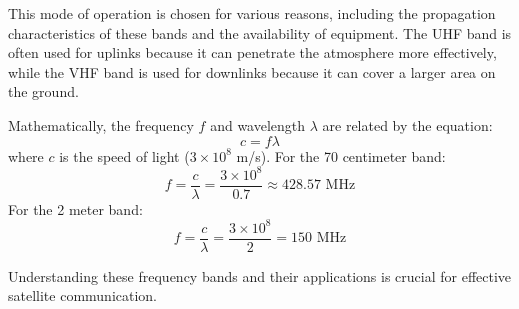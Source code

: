 This mode of operation is chosen for various reasons, including the propagation characteristics of these bands and the availability of equipment. The UHF band is often used for uplinks because it can penetrate the atmosphere more effectively, while the VHF band is used for downlinks because it can cover a larger area on the ground.

Mathematically, the frequency \( f \) and wavelength \( \lambda \) are related by the equation:
\[
c = f \lambda
\]
where \( c \) is the speed of light (\( 3 \times 10^8 \) m/s). For the 70 centimeter band:
\[
f = \frac{c}{\lambda} = \frac{3 \times 10^8}{0.7} \approx 428.57 \text{ MHz}
\]
For the 2 meter band:
\[
f = \frac{c}{\lambda} = \frac{3 \times 10^8}{2} = 150 \text{ MHz}
\]

Understanding these frequency bands and their applications is crucial for effective satellite communication.

